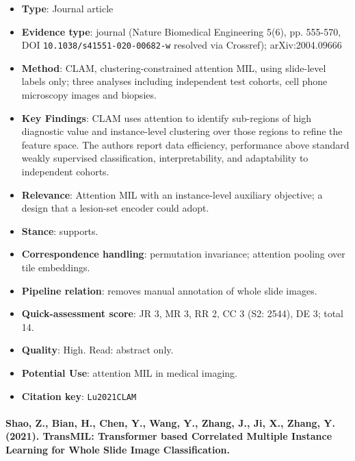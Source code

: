 \documentclass[journal,onecolumn]{IEEEtran}
\begin{document}
\begin{itemize}

\item{} \textbf{Type}: Journal article

\item{} \textbf{Evidence type}: journal (Nature Biomedical Engineering 5(6), pp. 555-570, DOI \nolinkurl{10.1038/s41551-020-00682-w} resolved via Crossref); arXiv:2004.09666

\item{} \textbf{Method}: CLAM, clustering-constrained attention MIL, using slide-level labels only; three analyses including independent test cohorts, cell phone microscopy images and biopsies.

\item{} \textbf{Key Findings}: CLAM uses attention to identify sub-regions of high diagnostic value and instance-level clustering over those regions to refine the feature space. The authors report data efficiency, performance above standard weakly supervised classification, interpretability, and adaptability to independent cohorts.

\item{} \textbf{Relevance}: Attention MIL with an instance-level auxiliary objective; a design that a lesion-set encoder could adopt.

\item{} \textbf{Stance}: supports.

\item{} \textbf{Correspondence handling}: permutation invariance; attention pooling over tile embeddings.

\item{} \textbf{Pipeline relation}: removes manual annotation of whole slide images.

\item{} \textbf{Quick-assessment score}: JR 3, MR 3, RR 2, CC 3 (S2: 2544), DE 3; total 14.

\item{} \textbf{Quality}: High. Read: abstract only.

\item{} \textbf{Potential Use}: attention MIL in medical imaging.

\item{} \textbf{Citation key}: \texttt{Lu2021CLAM}

\end{itemize}

\paragraph{Shao, Z., Bian, H., Chen, Y., Wang, Y., Zhang, J., Ji, X., Zhang, Y. (2021). TransMIL: Transformer based Correlated Multiple Instance Learning for Whole Slide Image Classification.~\cite{Shao2021TransMIL}}\mbox{}
\end{document}
